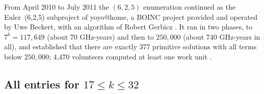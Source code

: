 \documentclass[11pt]{amsart}
\theoremstyle{definition}
\theoremstyle{remark}
\begin{document}
From April 2010 to July 2011 the $(6,2,5)$ enumeration continued as the Euler~(6,2,5)
subproject of yoyo@home, a BOINC project \cite{Anderson2004,Anderson2020} provided and
operated by Uwe Beckert, with an algorithm of Robert Gerbicz
\cite{YoyoEuler625,MeyrignacEuler625Forum2010,GerbiczMeyrignacBeckert2011}. It ran in two phases, to $7^6=117{,}649$ (about
70 GHz-years) and then to $250{,}000$ (about 740 GHz-years in all), and established that there are
exactly 377 primitive solutions with all terms below $250{,}000$; 4,470 volunteers computed at
least one work unit \cite{GerbiczMeyrignacBeckert2011}.

\clearpage
\begin{landscape}
\section{All entries for \texorpdfstring{$17\le k\le32$}{17 <= k <= 32}}\label{app:grid}
\begin{center}
\scriptsize

\label{tab:grid}
\end{center}
\end{landscape}



\end{document}
